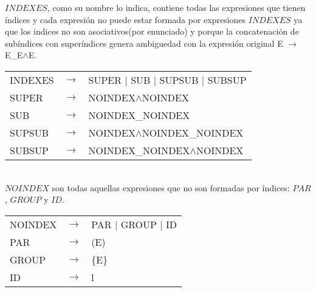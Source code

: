 $INDEXES$, como su nombre lo indica, contiene todas las expresiones que tienen índices y cada expresión no puede
estar formada por expresiones $INDEXES$ ya que los indices no son asociativos(por enunciado) y porque la concatenación
de subíndices con superíndices genera ambiguedad con la expresión original E $\rightarrow$ E\_E$\wedge$E. \\


\begin{tabular}{ l c l }
    INDEXES &  $\rightarrow$ & SUPER $|$ SUB $|$ SUPSUB $|$ SUBSUP \\
    SUPER &    $\rightarrow$ & NOINDEX$\wedge$NOINDEX \\
    SUB &      $\rightarrow$ & NOINDEX\_NOINDEX \\
    SUPSUB &   $\rightarrow$ & NOINDEX$\wedge$NOINDEX\_NOINDEX \\
    SUBSUP &   $\rightarrow$ & NOINDEX\_NOINDEX$\wedge$NOINDEX \\
\end{tabular}\\

$NOINDEX$ son todas aquellas expresiones que no son formadas por índices: $PAR$, $GROUP$ y $ID$. \\


\begin{tabular}{ l c l }
    NOINDEX &  $\rightarrow$ & PAR $|$ GROUP $|$ ID \\    
    PAR &      $\rightarrow$ & (E) \\
    GROUP &    $\rightarrow$ & \{E\} \\
    ID &       $\rightarrow$ & l \\
\end{tabular} \\
